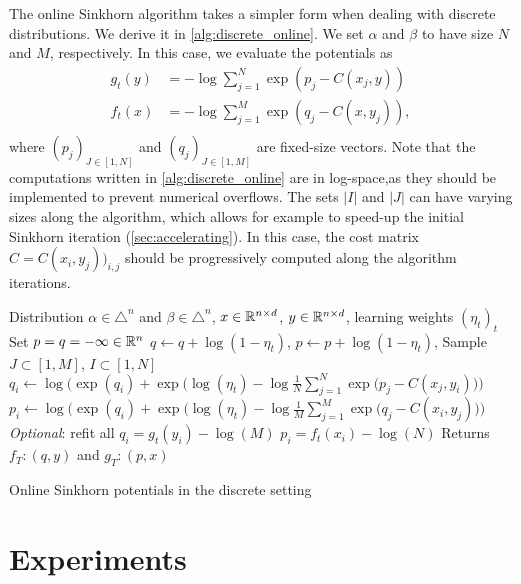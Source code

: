 The online Sinkhorn algorithm takes a simpler form when dealing with discrete
distributions. We derive it in \autoref{alg:discrete_online}. We set $\alpha$
and $\beta$ to have size $N$ and $M$, respectively. In this case, we evaluate
the potentials as
\begin{align}
    g_t(y) &= - \log \sum_{j=1}^N \exp(p_j - C(x_j, y)) \\
    f_t(x) &= - \log \sum_{j=1}^M \exp(q_j - C(x, y_j)), \\
\end{align}
where $(p_j)_{J \in [1, N]}$ and $(q_j)_{J \in [1, M]}$ are fixed-size vectors.
Note that the computations written in \autoref{alg:discrete_online} are
in log-space,as they should be implemented to prevent numerical overflows. The sets $|I|$ and $|J|$ can
have varying sizes along the algorithm, which allows for example to speed-up the
initial Sinkhorn iteration (\autoref{sec:accelerating}). In this case, the
cost matrix $\hat C = C(x_i,y_j))_{i,j}$ should be progressively computed along the algorithm iterations.

\begin{algorithm}[t]
    \begin{algorithmic}
    \Input Distribution $\alpha \in \triangle^n$ and 
    $\beta \in \triangle^n$, $x \in \mathbb{R}^{n \times d}$, 
    $y \in \mathbb{R}^{n \times d}$, learning weights ${(\eta_t)}_t$
    \State Set $p = q = - \infty \in \mathbb{R}^n$
        \State $q \gets q + \log(1 - \eta_t)$, $p \gets p + \log(1 - \eta_t)$,
        \State Sample $J \subset [1, M]$, 
        $I \subset [1, N]$
            \State $q_i \gets \log \Big( \exp(q_i)
            + \exp\big(\log(\eta_t) - \log \frac{1}{N} 
            \sum_{j=1}^{N} \exp(p_j - C(x_j, y_i)\big) \Big) $
        \EndFor
        \State $p_i \gets \log \Big( \exp(q_i)
        + \exp \big( \log(\eta_t) - \log \frac{1}{M} 
        \sum_{j=1}^{M} \exp(q_j - C(x_i, y_j)\big) \Big)$
        \EndFor
        \State \textit{Optional}: refit all $q_i = g_t(y_i) - \log (M)$
        \State\hspace{2.45cm} $p_i = f_t(x_i) - \log (N)$
    \EndFor
    \State Returns $f_T : (q, y)$ and
    $g_T : (p, x)$
    \end{algorithmic}
    \caption{Online Sinkhorn potentials in the discrete setting}\label{alg:discrete_online}
\end{algorithm}



\section{Experiments}\label{sec:supp_exp}

